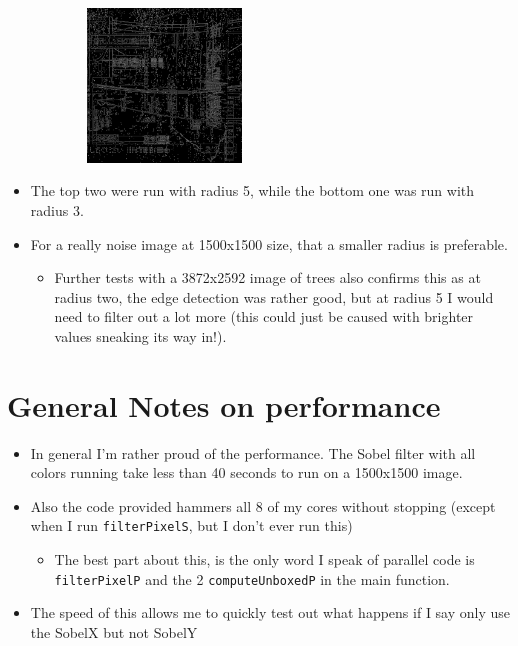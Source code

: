 \documentclass{article}
\begin{document}
\begin{enumerate}
\begin{enumerate}
\begin{itemize}
\begin{figure}
  \begin{subfigure}
    \centering
    \includegraphics[width=0.45\textwidth]{../data/grey-canny-3-120-300.png}
  \end{subfigure}
\end{figure}
\begin{itemize}
\item The top two were run with radius 5, while the bottom one was run
with radius 3.
\item For a really noise image at 1500x1500 size, that a smaller radius
is preferable.
\begin{itemize}
\item Further tests with a 3872x2592 image of trees also confirms this
as at radius two, the edge detection was rather good, but at
radius 5 I would need to filter out a lot more (this could just
be caused with brighter values sneaking its way in!).
\end{itemize}
\end{itemize}
\end{itemize}
\end{enumerate}
\end{enumerate}
\section{General Notes on performance}
\label{sec-2}
\begin{itemize}
\item In general I'm rather proud of the performance. The Sobel filter
with all colors running take less than 40 seconds to run on a
1500x1500 image.
\item Also the code provided hammers all 8 of my cores without stopping
(except when I run \texttt{filterPixelS}, but I don't ever run this)
\begin{itemize}
\item The best part about this, is the only word I speak of parallel
code is \texttt{filterPixelP} and the 2 \texttt{computeUnboxedP} in the main
function.
\end{itemize}
\item The speed of this allows me to quickly test out what happens if I
say only use the SobelX but not SobelY
\end{itemize}
\end{document}

